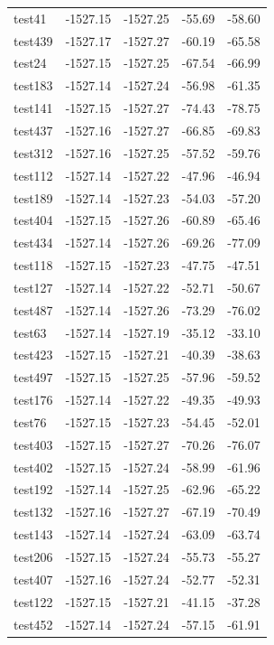 \documentclass[journal=jacsat,manuscript=article]{achemso}
\begin{document}
\begin{table}[b!]
\begin{tabular}{lrrrr}
test41  &  -1527.15 &  -1527.25 &  -55.69 &  -58.60 \\
test439 &  -1527.17 &  -1527.27 &  -60.19 &  -65.58 \\
test24  &  -1527.15 &  -1527.25 &  -67.54 &  -66.99 \\
test183 &  -1527.14 &  -1527.24 &  -56.98 &  -61.35 \\
test141 &  -1527.15 &  -1527.27 &  -74.43 &  -78.75 \\
test437 &  -1527.16 &  -1527.27 &  -66.85 &  -69.83 \\
test312 &  -1527.16 &  -1527.25 &  -57.52 &  -59.76 \\
test112 &  -1527.14 &  -1527.22 &  -47.96 &  -46.94 \\
test189 &  -1527.14 &  -1527.23 &  -54.03 &  -57.20 \\
test404 &  -1527.15 &  -1527.26 &  -60.89 &  -65.46 \\
test434 &  -1527.14 &  -1527.26 &  -69.26 &  -77.09 \\
test118 &  -1527.15 &  -1527.23 &  -47.75 &  -47.51 \\
test127 &  -1527.14 &  -1527.22 &  -52.71 &  -50.67 \\
test487 &  -1527.14 &  -1527.26 &  -73.29 &  -76.02 \\
test63  &  -1527.14 &  -1527.19 &  -35.12 &  -33.10 \\
test423 &  -1527.15 &  -1527.21 &  -40.39 &  -38.63 \\
test497 &  -1527.15 &  -1527.25 &  -57.96 &  -59.52 \\
test176 &  -1527.14 &  -1527.22 &  -49.35 &  -49.93 \\
test76  &  -1527.15 &  -1527.23 &  -54.45 &  -52.01 \\
test403 &  -1527.15 &  -1527.27 &  -70.26 &  -76.07 \\
test402 &  -1527.15 &  -1527.24 &  -58.99 &  -61.96 \\
test192 &  -1527.14 &  -1527.25 &  -62.96 &  -65.22 \\
test132 &  -1527.16 &  -1527.27 &  -67.19 &  -70.49 \\
test143 &  -1527.14 &  -1527.24 &  -63.09 &  -63.74 \\
test206 &  -1527.15 &  -1527.24 &  -55.73 &  -55.27 \\
test407 &  -1527.16 &  -1527.24 &  -52.77 &  -52.31 \\
test122 &  -1527.15 &  -1527.21 &  -41.15 &  -37.28 \\
test452 &  -1527.14 &  -1527.24 &  -57.15 &  -61.91 \\

\end{tabular}
\end{table}
\end{document}
